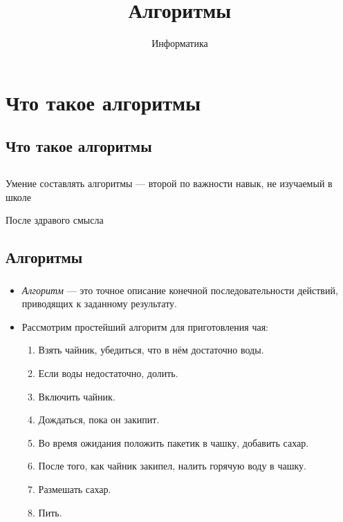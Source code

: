 \documentclass[compress,red]{beamer}
\title{Алгоритмы}
\author{Информатика}
\begin{document}
\maketitle

\section{Что такое алгоритмы}

\subsection{Что такое алгоритмы}
\subsection{}
\begin{frame}
  \begin{center}
    \Large{Умение составлять алгоритмы --- второй по важности навык, не изучаемый в школе}
  \end{center}
  \begin{center}
    \small{После здравого смысла}
  \end{center}
\end{frame}

\subsection{Алгоритмы}
\begin{frame}[fragile]
  \frametitle{}
  \begin{itemize}
    \item \emph{Алгоритм} --- это точное описание конечной последовательности действий, приводящих к заданному результату.
    \item Рассмотрим простейший алгоритм для приготовления чая:
    \begin{enumerate}
        \item Взять чайник, убедиться, что в нём достаточно воды.
        \item Если воды недостаточно, долить.
        \item Включить чайник.
        \item Дождаться, пока он закипит.
        \item Во время ожидания положить пакетик в чашку, добавить сахар.
        \item После того, как чайник закипел, налить горячую воду в чашку.
        \item Размешать сахар.
        \item Пить.
    \end{enumerate}
  \end{itemize}
\end{frame}
\end{document}

